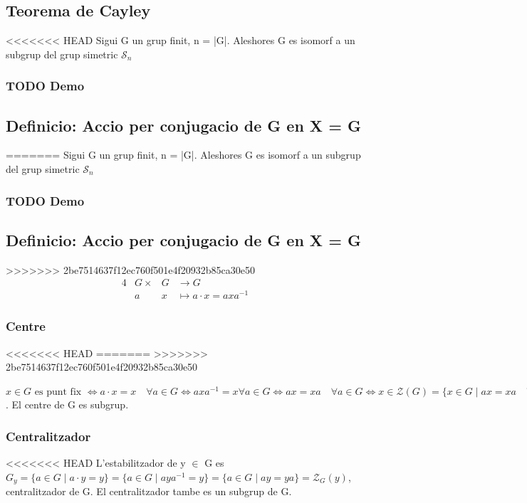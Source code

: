 \documentclass[11pt]{article}
\begin{document}
\subsection{Teorema de Cayley}
<<<<<<< HEAD
\label{sec:org6c0efc6}
Sigui G un grup finit, n = |G|. Aleshores G es isomorf a un subgrup del grup simetric \(\mathcal{S}_n\)
\subsubsection{{\bfseries\sffamily TODO} Demo}
\label{sec:org637c9b9}


\subsection{Definicio: Accio per conjugacio de G en X = G}
\label{sec:org6b44e02}
=======
\label{sec:org24ba12a}
Sigui G un grup finit, n = |G|. Aleshores G es isomorf a un subgrup del grup simetric \(\mathcal{S}_n\)
\subsubsection{{\bfseries\sffamily TODO} Demo}
\label{sec:org311d1f8}


\subsection{Definicio: Accio per conjugacio de G en X = G}
\label{sec:orge8c9add}
>>>>>>> 2be7514637f12ec760f501e4f20932b85ca30e50
\begin{alignat*}{4}
&G \times &G &\to G \\
&a &x &\mapsto a \cdot x = axa^{-1}
\end{alignat*}

\subsubsection{Centre}
<<<<<<< HEAD
\label{sec:org07deeb4}
=======
\label{sec:orgf29839c}
>>>>>>> 2be7514637f12ec760f501e4f20932b85ca30e50

\(x \in G \text{ es punt fix } \iff a \cdot x = x \quad \forall a \in G \iff axa^{-1} = x \forall a \in G \iff ax = xa \quad \forall a \in G \iff x \in \mathcal{Z}(G) = \{ x \in G \mid ax = xa \quad \forall a \in G \} = \text{ centre de G}\). El centre de G es subgrup.

\subsubsection{Centralitzador}
<<<<<<< HEAD
\label{sec:orgc791405}
L'estabilitzador de y \(\in\) G es \(G_y = \{a \in G \mid a \cdot y = y \} = \{ a \in G \mid aya^{-1} = y \} = \{ a \in G \mid ay = ya \} = \mathcal{Z}_{G}(y)\),  centralitzador de G. El centralitzador tambe es un subgrup de G.
\end{document}
